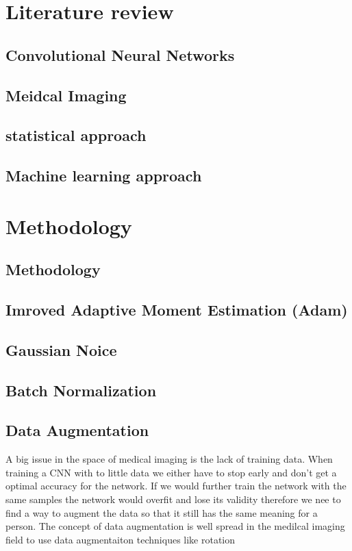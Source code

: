 \documentclass[acmsmall, review]{acmart}
\begin{document}
\section{Literature review}
\subsection{Convolutional Neural Networks}
\subsection{Meidcal Imaging }
\subsection{statistical approach}
\subsection{Machine learning approach}


\section{Methodology}
\subsection{Methodology}
\subsection{Imroved Adaptive Moment Estimation (Adam)}
\subsection{Gaussian Noice}
\begin{comment}
	adding annealed Gaussian noise to the gradien
	-	surprisingly effective
	-	experiments indicate that adding annealed Gaussian noise by decaying the variance works better than using fixed Gaussian noise
	-	-adding n
	-	-random restarts and the use of a momentum-based optimizer like Adam are not sufficient to achieve the best results in the absence of added gradient noiseoise to the gradient helps in achieving higher average and best accuracy	content...
\end{comment}

\subsection{Batch Normalization}
\subsection{Data Augmentation}
A big issue in the space of medical imaging is the lack of training data. When training a CNN with to little data we either have to stop early and don't get a optimal accuracy for the network. If we would further train the network with the same samples the network would overfit and lose its validity  
therefore we nee to find a way to augment the data so that it still has the same meaning for a person. The concept of data augmentation is well spread in the medilcal imaging field 
to use data augmentaiton techniques like rotation 
\end{document}
